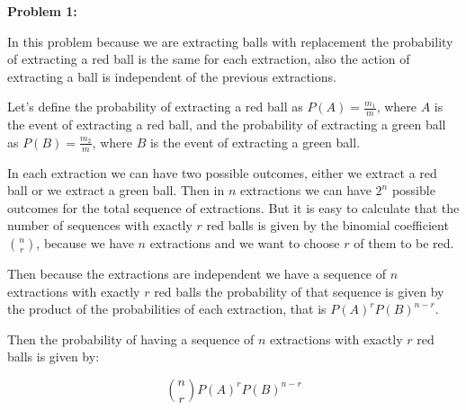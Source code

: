 \textbf{Problem 1:}

\singlespacing

In this problem because we are extracting balls with replacement
the probability of extracting a red ball is the same for each extraction, also
the action of extracting a ball is independent of the previous extractions.

\singlespacing

Let's define the probability of extracting a red ball as $P(A) = \frac{m_1}{m}$, where
$A$ is the event of extracting a red ball, and the probability of extracting a green ball as $P(B) = \frac{m_2}{m}$, where
$B$ is the event of extracting a green ball.

\singlespacing

In each extraction we can have two possible outcomes, either we extract a red ball
or we extract a green ball. Then in $n$ extractions we can have $2^n$ possible outcomes for
the total sequence of extractions. But it is easy to calculate that the number of sequences
with exactly $r$ red balls is given by the binomial coefficient $\binom{n}{r}$, because
we have $n$ extractions and we want to choose $r$ of them to be red.

\singlespacing

Then because the extractions are independent we have a sequence of $n$ extractions
with exactly $r$ red balls the probability of that sequence is given by the product of the
probabilities of each extraction, that is $P(A)^r P(B)^{n-r}$.

\singlespacing

Then the probability of having a sequence of $n$ extractions with exactly $r$ red balls is given by:

\singlespacing

\begin{equation}
    \binom{n}{r} P(A)^r P(B)^{n-r}
\end{equation}